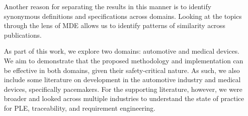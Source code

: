 Another reason for separating the results in this manner is to identify synonymous definitions and specifications across domains. Looking at the topics through the lens of \gls{MDE} allows us to identify patterns of similarity across publications. 



As part of this work, we explore two domains: automotive and medical devices. We aim to demonstrate that the proposed methodology and implementation can be effective in both domains, given their safety-critical nature. As such, we also include some literature on development in the automotive industry and medical devices, specifically pacemakers. For the supporting literature, however, we were broader and looked across multiple industries to understand the state of practice for \gls{PLE}, traceability, and requirement engineering.





%


